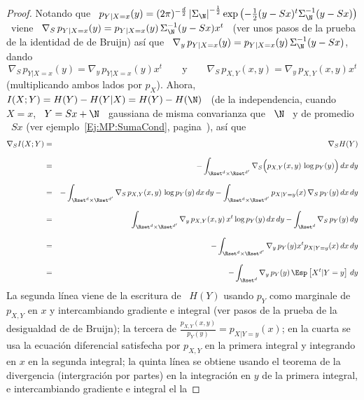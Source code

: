 %
\begin{proof}
  Notando  que \ $p_{Y|X=x}  (y) =  (2 \pi)^{-\frac{d}{2}}  \left| \Sigma_\N
  \right|^{-\frac12}  \exp\left( -\frac12  (y-S  x)^t \Sigma_\N^{-1}  (y-Sx)
  \right)$   \   viene  \   $\nabla_S   \,   p_{Y|X=x}(y)   =  p_{Y|X=x}(y)   \,
  \Sigma_\N^{-1}  (y -  S x)  x^t$ \  (ver  unos pasos  de la  prueba de  la
  identidad de de  Bruijn) as\'i que \ $\nabla_y  \, p_{Y|X=x}(y) = p_{Y|X=x}(y)
  \, \Sigma_\N^{-1} (y - S x)$, dando
  \[
  \nabla_S \, p_{Y|X=x}(y) = \nabla_y \, p_{Y|X=x}(y) x^t \qquad \mbox{y} \qquad
  \nabla_S \, p_{X,Y}(x,y) = \nabla_y \, p_{X,Y}(x,y) x^t
  \]
  (multiplicando ambos lados por $p_X$). Ahora, \ $I(X;Y) = H(Y) - H(Y|X) = H(Y)
  - H(\N)$ \ (de la independencia, cuando \ $X  = x$, \ $Y = S x + \N$ \
  gaussiana de  misma convarianza que \  $\N$ \ y  de promedio \ $S  x$ (ver
  ejemplo~\ref{Ej:MP:SumaCond}, pagina~\pageref{Ej:MP:SumaCond}), as\'i que
  \begin{eqnarray*}
  \nabla_S I(X;Y) & = & \nabla_S H(Y)\\[2.5mm]
  & = & - \int_{\Rset^d \times \Rset^{d'}} \nabla_S \Big( p_{X,Y}(x,y) \, \log
  p_Y(y) \Big) \, dx \, dy\\[2.5mm]
  & = & - \int_{\Rset^d \times \Rset^{d'}} \nabla_S \, p_{X,Y}(x,y) \, \log p_Y(y) \,
  dx \, dy - \int_{\Rset^d \times \Rset^{d'}} p_{X|Y=y}(x) \, \nabla_S \, p_Y(y) \, dx \,
  dy\\[2.5mm]
  & = & \int_{\Rset^d \times \Rset^{d'}} \nabla_y \, p_{X,Y}(x,y) \, x^t \log p_Y(y)
  \, dx \, dy - \int_{\Rset^d} \nabla_S \, p_Y(y) \, dy\\[2.5mm]
  & = & - \int_{\Rset^d \times \Rset^{d'}} \nabla_y \, p_Y(y) x^t p_{X|Y=y}(x) \, dx
  \, dy\\[2.5mm]
  & = & - \int_{\Rset^d} \nabla_y \, p_Y(y) \, \Esp\left[X^t | Y = y \right] \, dy
  \end{eqnarray*}
  La  segunda l\'inea  viene  de la  escritura  de \  $H(Y)$  usando $p_Y$  como
  marginale de $p_{X,Y}$ en $x$ y intercambiando gradiente e integral (ver pasos
  de   la   prueba  de   la   desigualdad  de   de   Bruijn);   la  tercera   de
  $\frac{p_{X,Y}(x,y)}{p_Y(y)}  =   p_{X|Y=y}(x)$;  en  la  cuarta   se  usa  la
  ecuaci\'on  diferencial satisfecha  por  $p_{X,Y}$ en  la  primera integral  y
  integrando en $x$ en la segunda  integral; la quinta l\'inea se obtiene usando
  el teorema de  la divergencia (intergraci\'on por partes)  en la integraci\'on
  en $y$  de la primera  integral, e intercambiando  gradiente e integral  el la

\end{proof}

